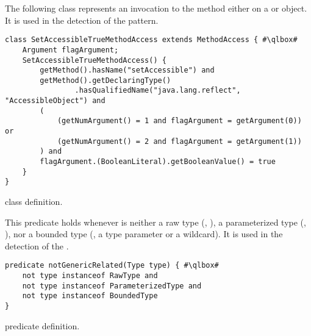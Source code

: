 The following class represents an invocation to the  method either on a  or  object.
It is used in the detection of the  pattern.

\begin{listing}
\begin{verbatim}
class SetAccessibleTrueMethodAccess extends MethodAccess { #\qlbox#
	Argument flagArgument;
	SetAccessibleTrueMethodAccess() {
		getMethod().hasName("setAccessible") and
		getMethod().getDeclaringType()
				.hasQualifiedName("java.lang.reflect", "AccessibleObject") and
		(
			(getNumArgument() = 1 and flagArgument = getArgument(0)) or
			(getNumArgument() = 2 and flagArgument = getArgument(1))
		) and
		flagArgument.(BooleanLiteral).getBooleanValue() = true
	}	
}
\end{verbatim}
\caption{ class definition.}
\label{lst:ql:SetAccessibleTrueMethodAccess}
\end{listing}

This predicate holds whenever  is neither
a raw type (\eg{}, ),
a parameterized type (\eg{}, ), nor
a bounded type (\ie{}, a type parameter or a wildcard).
It is used in the detection of the .

\begin{listing}
\begin{verbatim}
predicate notGenericRelated(Type type) { #\qlbox#
	not type instanceof RawType and
	not type instanceof ParameterizedType and
	not type instanceof BoundedType
}
\end{verbatim}
\caption{ predicate definition.}
\label{lst:ql:notGenericRelated}
\end{listing}

